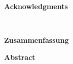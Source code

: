 \bigskip

~

\newpage 


~

\bigskip

\huge \textbf{Acknowledgments}

\vspace*{\fill}

\large 
\myAcknowledgements


\bigskip

~

\newpage 


\huge \textbf{Zusammenfassung}

\vspace*{\fill}

\normalsize
\myZusammenfassung



\newpage



\huge \textbf{Abstract}

\vspace*{\fill}

\normalsize
\myAbstract


\bigskip

~

\newpage 



\thispagestyle{empty}  %
\quad 
\newpage